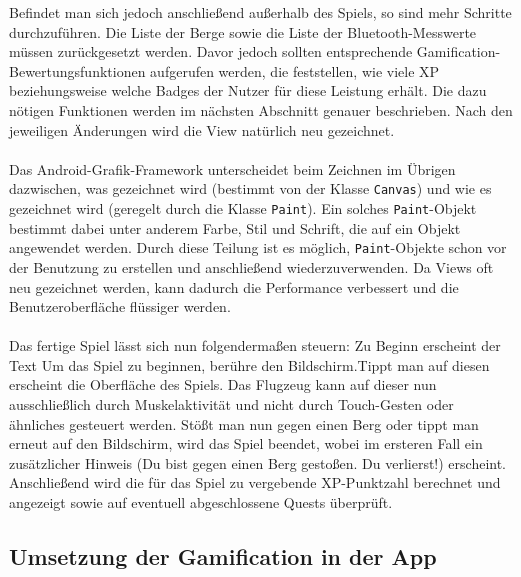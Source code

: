 Befindet man sich jedoch anschließend außerhalb des Spiels, so sind mehr Schritte durchzuführen. Die Liste der Berge sowie die Liste der Bluetooth-Messwerte müssen zurückgesetzt werden. Davor jedoch sollten entsprechende Gamification-Bewertungsfunktionen aufgerufen werden, die feststellen, wie viele XP beziehungsweise welche Badges der Nutzer für diese Leistung erhält. Die dazu nötigen Funktionen werden im nächsten Abschnitt genauer beschrieben. Nach den jeweiligen Änderungen wird die View natürlich neu gezeichnet. \\ \\
Das Android-Grafik-Framework unterscheidet beim Zeichnen im Übrigen dazwischen, was gezeichnet wird (bestimmt von der Klasse \texttt{Canvas}) und wie es gezeichnet wird (geregelt durch die Klasse \texttt{Paint}).\cite{Src:CustomView} Ein solches \texttt{Paint}-Objekt bestimmt dabei unter anderem Farbe, Stil und Schrift, die auf ein Objekt angewendet werden. Durch diese Teilung ist es möglich, \texttt{Paint}-Objekte schon vor der Benutzung zu erstellen und anschließend wiederzuverwenden. Da Views oft neu gezeichnet werden, kann dadurch die Performance verbessert und die Benutzeroberfläche flüssiger werden.\cite{Src:CustomView} \\ \\
Das fertige Spiel lässt sich nun folgendermaßen steuern: Zu Beginn erscheint der Text \glqq Um das Spiel zu beginnen, berühre den Bildschirm.\grqq Tippt man auf diesen erscheint die Oberfläche des Spiels. Das Flugzeug kann auf dieser nun ausschließlich durch Muskelaktivität und nicht durch Touch-Gesten oder ähnliches gesteuert werden. Stößt man nun gegen einen Berg oder tippt man erneut auf den Bildschirm, wird das Spiel beendet, wobei im ersteren Fall ein zusätzlicher Hinweis (\glqq Du bist gegen einen Berg gestoßen. Du verlierst!\grqq) erscheint. Anschließend wird die für das Spiel zu vergebende XP-Punktzahl berechnet und angezeigt sowie auf eventuell abgeschlossene Quests überprüft.

\subsection{Umsetzung der Gamification in der App}
